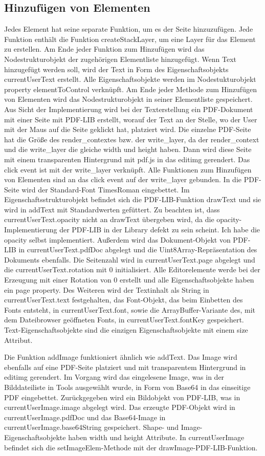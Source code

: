 \subsection{Hinzufügen von Elementen}
Jedes Element hat seine separate Funktion, um es der Seite hinzuzufügen. Jede Funktion enthält die Funktion createStackLayer, um eine Layer für das Element zu erstellen. Am Ende jeder Funktion zum Hinzufügen wird das Nodestrukturobjekt der zugehörigen Elementliste hinzugefügt. Wenn Text hinzugefügt werden soll, wird der Text in Form des Eigenschaftsobjekts currentUserText erstellt. Alle Eigenschaftsobjekte werden im Nodestukturobjekt property elementToControl verknüpft. Am Ende jeder Methode zum Hinzufügen von Elementen wird das Nodestrukturobjekt in seiner Elementliste gespeichert. Aus Sicht der Implementierung wird bei der Texterstellung ein PDF-Dokument mit einer Seite mit PDF-LIB erstellt, worauf der Text an der Stelle, wo der User mit der Maus auf die Seite geklickt hat, platziert wird. Die einzelne PDF-Seite hat die Größe des render\_contextes bzw. der write\_layer, da der render\_context und die write\_layer die gleiche width und height haben. Dann wird diese Seite mit einem transparenten Hintergrund mit pdf.js in das editimg gerendert. Das click event ist mit der write\_layer verknüpft. Alle Funktionen zum Hinzufügen von Elementen sind an das click event auf der write\_layer gebunden. In die PDF-Seite wird der Standard-Font TimesRoman eingebettet. Im Eigenschaftsstrukturobjekt befindet sich die PDF-LIB-Funktion drawText und sie wird in addText mit Standardwerten gefüttert. Zu beachten ist, dass currentUserText.opacity nicht an drawText übergeben wird, da die opacity-Implementierung der PDF-LIB in der Library defekt zu sein scheint. Ich habe die opacity selbst implementiert. Außerdem wird das Dokument-Objekt von PDF-LIB in currentUserText.pdfDoc abgelegt und die Uint8Array-Repräsentation des Dokuments ebenfalls. Die Seitenzahl wird in currentUserText.page abgelegt und die currentUserText.rotation mit 0 initialisiert. Alle Editorelemente werde bei der Erzeugung mit einer Rotation von 0 erstellt und alle Eigenschaftsobjekte haben ein page property. Des Weiteren wird der Textinhalt als String in currentUserText.text festgehalten, das Font-Objekt, das beim Einbetten des Fonts entsteht, in currentUserText.font, sowie die ArrayBuffer-Variante des, mit dem Dateibrowser geöffneten Fonts, in currentUserText.fontKey gespeichert. Text-Eigenschaftsobjekte sind die einzigen Eigenschaftsobjekte mit einem size Attribut.
\par
Die Funktion addImage funktioniert ähnlich wie addText. Das Image wird ebenfalls auf eine PDF-Seite platziert und mit transparentem Hintergrund in editimg gerendert. Im Vorgang wird das eingelesene Image, was in der Bilddateiliste in Tools ausgewählt wurde, in Form von Base64 in das einseitige PDF eingebettet. Zurückgegeben wird ein Bildobjekt von PDF-LIB, was in currentUserImage.image abgelegt wird. Das erzeugte PDF-Objekt wird in currentUserImage.pdfDoc und das Base64-Image in currentUserImage.base64String gespeichert. Shape- und Image-Eigenschaftsobjekte haben width und height Attribute. In currentUserImage befindet sich die setImageElem-Methode mit der drawImage-PDF-LIB-Funktion.
